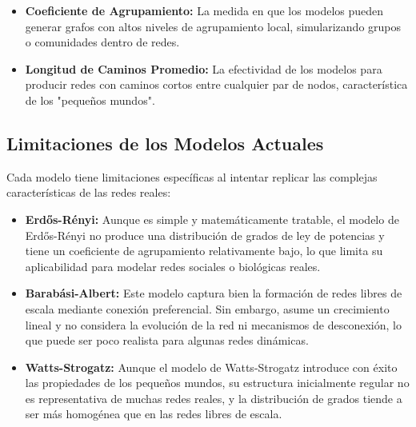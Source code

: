\documentclass[12pt]{book}
\begin{document}
\begin{itemize}
    \item \textbf{Coeficiente de Agrupamiento:} La medida en que los modelos pueden generar grafos con altos niveles de agrupamiento local, simularizando grupos o comunidades dentro de redes.
    \item \textbf{Longitud de Caminos Promedio:} La efectividad de los modelos para producir redes con caminos cortos entre cualquier par de nodos, característica de los "pequeños mundos".
\end{itemize}

\subsection{Limitaciones de los Modelos Actuales}

Cada modelo tiene limitaciones específicas al intentar replicar las complejas características de las redes reales:

\begin{itemize}
    \item \textbf{Erdős-Rényi:} Aunque es simple y matemáticamente tratable, el modelo de Erdős-Rényi no produce una distribución de grados de ley de potencias y tiene un coeficiente de agrupamiento relativamente bajo, lo que limita su aplicabilidad para modelar redes sociales o biológicas reales.
    \item \textbf{Barabási-Albert:} Este modelo captura bien la formación de redes libres de escala mediante conexión preferencial. Sin embargo, asume un crecimiento lineal y no considera la evolución de la red ni mecanismos de desconexión, lo que puede ser poco realista para algunas redes dinámicas.
    \item \textbf{Watts-Strogatz:} Aunque el modelo de Watts-Strogatz introduce con éxito las propiedades de los pequeños mundos, su estructura inicialmente regular no es representativa de muchas redes reales, y la distribución de grados tiende a ser más homogénea que en las redes libres de escala.
\end{itemize}
\end{document}
